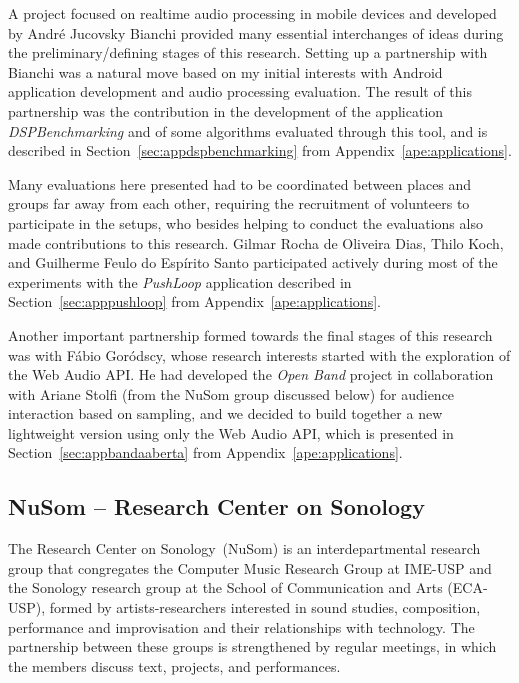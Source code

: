A project focused on realtime audio processing in mobile devices and developed by André Jucovsky Bianchi provided many essential interchanges of ideas during the preliminary/defining stages of this research.
Setting up a partnership with Bianchi was a natural move based on my initial interests with Android application development and audio processing evaluation.
The result of this partnership was the contribution in the development of the application \textit{DSPBenchmarking} and of some algorithms evaluated through this tool, and is described in Section~\ref{sec:appdspbenchmarking} from Appendix~\ref{ape:applications}.

Many evaluations here presented had to be coordinated between places and groups far away from each other, requiring the recruitment of volunteers to participate in the setups, who besides helping to conduct the evaluations also made contributions to this research.
Gilmar Rocha de Oliveira Dias, Thilo Koch, and Guilherme Feulo do Espírito Santo participated actively during most of the experiments with the \textit{PushLoop} application described in Section~\ref{sec:apppushloop} from Appendix~\ref{ape:applications}.

Another important partnership formed towards the final stages of this research was with Fábio Goródscy, whose research interests started with the exploration of the Web Audio API.
He had developed the \textit{Open Band} project in collaboration with Ariane Stolfi (from the NuSom group discussed below) for audience interaction based on sampling, and we decided to build together a new lightweight version using only the Web Audio API, which is presented in Section~\ref{sec:appbandaaberta} from Appendix~\ref{ape:applications}.


\subsection*{NuSom – Research Center on Sonology}

The Research Center on Sonology~(NuSom) is an interdepartmental research group that congregates the Computer Music Research Group at IME-USP and the Sonology research group at the School of Communication and Arts (ECA-USP), formed by artists-researchers interested in sound studies, composition,  performance and improvisation and their relationships with technology.
The partnership between these groups is strengthened by regular meetings, in which the members discuss text, projects, and performances.

